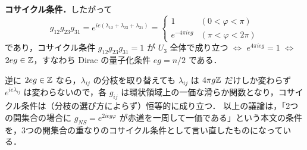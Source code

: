 \textbf{コサイクル条件．}したがって
\[
  g_{12}g_{23}g_{31}=e^{ie(\lambda_{12}+\lambda_{23}+\lambda_{31})}=
  \begin{cases}1&(0<\varphi<\pi)\\ e^{-4\pi ieg}&(\pi<\varphi<2\pi)\end{cases}
\]
であり，コサイクル条件 $g_{12}g_{23}g_{31}=1$ が $U_3$ 全体で成り立つ $\iff$ $e^{4\pi ieg}=1$ $\iff$ $2eg\in\mathbb{Z}$，すなわち Dirac の量子化条件 $eg=n/2$ である．

逆に $2eg\in\mathbb{Z}$ なら，$\lambda_{ij}$ の分枝を取り替えても $\lambda_{ij}$ は $4\pi g\mathbb{Z}$ だけしか変わらず $e^{ie\lambda_{ij}}$ は変わらないので，各 $g_{ij}$ は環状領域上の一価な滑らか関数となり，コサイクル条件は（分枝の選び方によらず）恒等的に成り立つ．
以上の議論は，「2つの開集合の場合に $g_{NS}=e^{2ieg\varphi}$ が赤道を一周して一価である」という本文の条件を，3つの開集合の重なりのコサイクル条件として言い直したものになっている．
